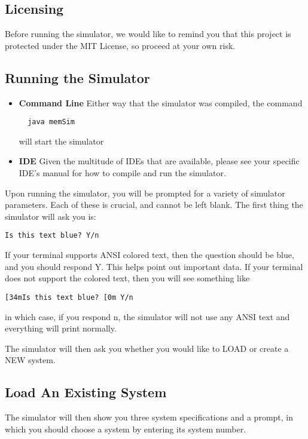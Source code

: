\documentclass[12pt]{article}
\newcommand{\singlespace}{
  \protect\renewcommand\baselinestretch{1.0}
  \protect\normalsize
}
\begin{document}
\subsection{Licensing}
Before running the simulator, we would like to remind you that this
project is protected under the MIT License, so proceed at your own risk.

\subsection{Running the Simulator}
\begin{itemize}
\item \textbf{Command Line}
  Either way that the simulator was compiled, the command
{\singlespace
\begin{verbatim}
  java memSim
\end{verbatim}
}
  will start the simulator
\item \textbf{IDE}
  Given the multitude of IDEs that are available, please see your
  specific IDE's manual for how to compile and run the simulator.
\end{itemize}
Upon running the simulator, you will be prompted for a variety of 
simulator parameters. Each of these is crucial, and cannot be left blank.
The first thing the simulator will ask you is:
{\singlespace
\begin{verbatim}
Is this text blue? Y/n
\end{verbatim}
}
If your terminal supports ANSI colored text, then the question should be blue,
and you should respond Y. This helps point out important data.
If your terminal does not support the colored text, then you will see something like

\begin{verbatim}
[34mIs this text blue? [0m Y/n
\end{verbatim}
in which case, if you respond n, the simulator will not use any ANSI text and
everything will print normally.

The simulator will then ask you whether you would like to LOAD or create a NEW system.

\subsection*{Load An Existing System}
The simulator will then show you three system specifications and a prompt, in which
you should choose a system by entering its system number.
\end{document}
